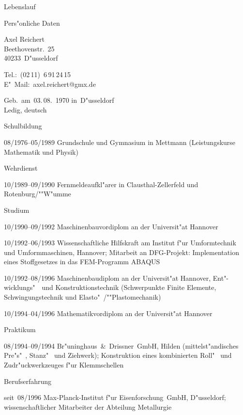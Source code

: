 \documentclass[12pt,a4paper]{article}
\newcommand*{\ac}[1]{\mbox{#1}}
\begin{document}
\begin{cv}{Lebenslauf}
  \begin{cvlist}{Pers"onliche Daten}
  \item Axel Reichert\\
    Beethovenstr.~25\\
    40233~D"usseldorf
  \item Tel.:~(02\,11)~6\,91\,24\,15\\
    E"~Mail:~axel.reichert@gmx.de
  \item Geb.~am~03.\,08.~1970 in~D"usseldorf\\
    Ledig, deutsch
  \end{cvlist}
  \begin{cvlist}{Schulbildung}
  \item[08/1976--05/1989] Grundschule und Gymnasium in Mettmann
    (Leistungskurse Mathematik und Physik)
  \end{cvlist}
  \begin{cvlist}{Wehrdienst}
  \item[10/1989--09/1990] Fernmeldeaufkl"arer in Clausthal-Zellerfeld
    und Rotenburg/""W"umme
  \end{cvlist}
  \begin{cvlist}{Studium}
  \item[10/1990--09/1992] Maschinenbauvordiplom an der Universit"at
    Hannover
  \item[10/1992--06/1993] Wissenschaftliche Hilfskraft am Institut
    f"ur Umformtechnik und Umformmaschinen, Hannover; Mitarbeit an
    DFG-Projekt: Implementation eines Stoffgesetzes in das
    \ac{FEM}-Programm \ac{ABAQUS}
  \item[10/1992--08/1996] Maschinenbaudiplom an der Universit"at
    Hannover, Ent"-wicklungs"~~und Konstruktionstechnik (Schwerpunkte
    Finite Elemente, Schwingungstechnik und Elasto"~/""Plastomechanik)
  \item[10/1994--04/1996] Mathematikvordiplom an der Universit"at
    Hannover
  \end{cvlist}
  \begin{cvlist}{Praktikum}
  \item[08/1994--09/1994] Br"uninghaus~\&~Drissner~GmbH, Hilden
    (mittelst"andisches Pre"s"~, Stanz"~ und Ziehwerk); Konstruktion
    eines kombinierten Roll"~ und Zudr"uckwerkzeuges f"ur
    Klemmschellen
  \end{cvlist}
  \begin{cvlist}{Berufserfahrung}
  \item[seit~08/1996] Max-Planck-Institut f"ur Eisenforschung~GmbH,
    D"usseldorf; wissenschaftlicher Mitarbeiter der Abteilung
    Metallurgie


\end{cvlist}
\end{cv}
\end{document}
